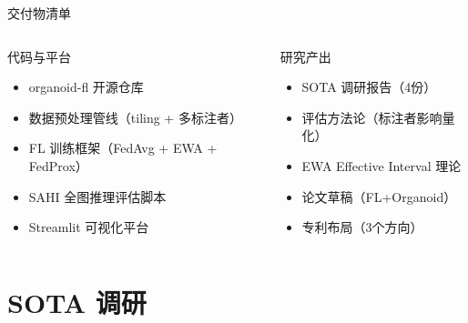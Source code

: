 \documentclass[aspectratio=169, 10pt]{beamer}
\begin{document}
\begin{frame}{交付物清单}
  \begin{columns}[T]
    \begin{block}{代码与平台}
      \begin{itemize}
        \item organoid-fl 开源仓库
        \item 数据预处理管线（tiling + 多标注者）
        \item FL 训练框架（FedAvg + EWA + FedProx）
        \item SAHI 全图推理评估脚本
        \item Streamlit 可视化平台
      \end{itemize}
    \end{block}
    \begin{block}{研究产出}
      \begin{itemize}
        \item SOTA 调研报告（4份）
        \item 评估方法论（标注者影响量化）
        \item EWA Effective Interval 理论
        \item 论文草稿（FL+Organoid）
        \item 专利布局（3个方向）
      \end{itemize}
    \end{block}
  \end{columns}
\end{frame}

\section{SOTA 调研}
\end{document}
